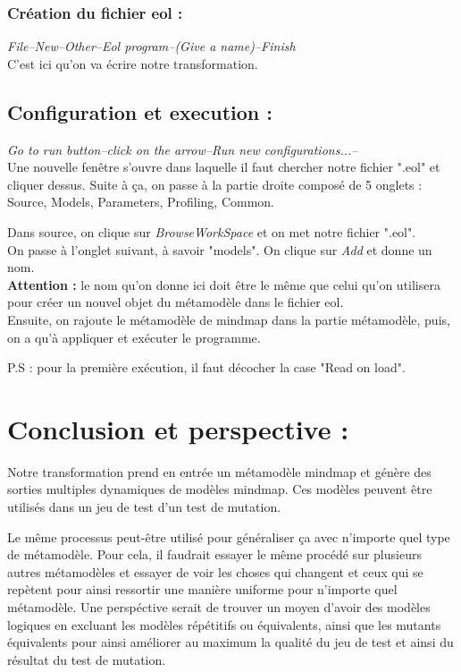 \documentclass[french]{article}
\begin{document}
\subsubsection{Création du fichier eol :}
\hspace{13 mm} \textit{File--New--Other--Eol program--(Give a name)--Finish}  \linebreak \\
C'est ici qu'on va écrire notre transformation.

\newpage

\subsection{Configuration et execution :}

\textit{Go to run button--click on the arrow--Run new configurations...--} \linebreak \\

Une nouvelle fenêtre s'ouvre dans laquelle il faut chercher notre fichier ".eol" et cliquer dessus.
Suite à ça, on passe à la partie droite composé de 5 onglets : Source, Models, Parameters, Profiling, Common.
\par
Dans source, on clique sur \textit{BrowseWorkSpace} et on met notre fichier ".eol". \\
On passe à l'onglet suivant, à savoir "models".
On clique sur \textit{Add} et donne un nom. \linebreak \\
\textbf{Attention :} le nom qu'on donne ici doit être le même que celui qu'on utilisera pour créer un nouvel objet du métamodèle dans le fichier eol.\\
Ensuite, on rajoute le métamodèle de mindmap dans la partie métamodèle, puis, on a qu'à appliquer et exécuter le programme.

P.S : pour la première exécution, il faut décocher la case "Read on load".

\newpage

\section{Conclusion et perspective :}
	
	Notre transformation prend en entrée un métamodèle mindmap et génère des sorties multiples dynamiques de modèles mindmap. Ces modèles peuvent être utilisés dans un jeu de test d'un test de mutation.
	\par 
	Le même processus peut-être utilisé pour généraliser ça avec n'importe quel type de métamodèle. Pour cela, il faudrait essayer le même procédé sur plusieurs autres métamodèles et essayer de voir les choses qui changent et ceux qui se repètent pour ainsi ressortir une manière uniforme pour n'importe quel métamodèle. Une perspéctive serait de trouver un moyen d'avoir des modèles logiques en excluant les modèles répétitifs ou équivalents, ainsi que les mutants équivalents pour ainsi améliorer au maximum la qualité du jeu de test et ainsi du résultat du test de mutation. 		
\end{document}
